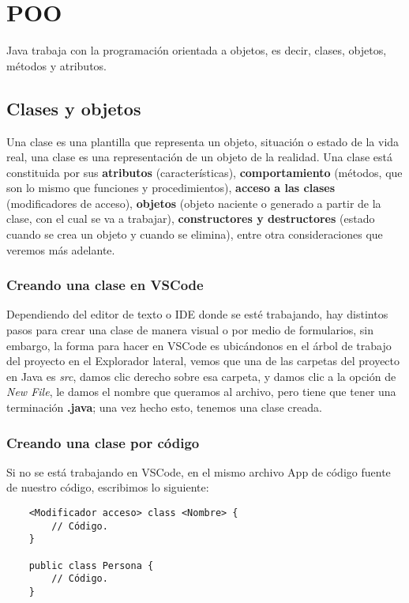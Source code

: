 \section{POO}

Java trabaja con la programación orientada a objetos, es decir, clases, objetos, métodos y atributos.


\subsection{Clases y objetos}

Una clase es una plantilla que representa un objeto, situación o estado de la vida real, una clase es una representación de un objeto de la realidad. Una clase está constituida por sus \textbf{atributos} (características), \textbf{comportamiento} (métodos, que son lo mismo que funciones y procedimientos), \textbf{acceso a las clases} (modificadores de acceso), \textbf{objetos} (objeto naciente o generado a partir de la clase, con el cual se va a trabajar), \textbf{constructores y destructores} (estado cuando se crea un objeto y cuando se elimina), entre otra consideraciones que veremos más adelante.


\subsubsection{Creando una clase en VSCode}
Dependiendo del editor de texto o IDE donde se esté trabajando, hay distintos pasos para crear una clase de manera visual o por medio de formularios, sin embargo, la forma para hacer en VSCode es ubicándonos en el árbol de trabajo del proyecto en el Explorador lateral, vemos que una de las carpetas del proyecto en Java es \textit{src}, damos clic derecho sobre esa carpeta, y damos clic a la opción de \textit{New File}, le damos el nombre que queramos al archivo, pero tiene que tener una terminación \textbf{.java}; una vez hecho esto, tenemos una clase creada.


\subsubsection{Creando una clase por código}

Si no se está trabajando en VSCode, en el mismo archivo App de código fuente de nuestro código, escribimos lo siguiente:
\begin{lstlisting}
    <Modificador acceso> class <Nombre> {
        // Código.
    }

    public class Persona {
        // Código.
    }
\end{lstlisting}

